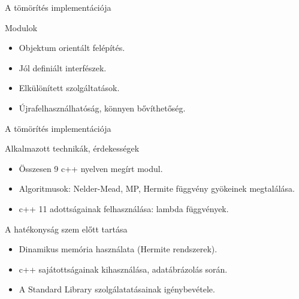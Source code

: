\documentclass{beamer}
\begin{document}
\begin{frame}{A tömörítés implementációja}
\linespread{0.8}
\small
\vspace{-2mm}
\begin{block}{Modulok}
	\begin{itemize}
		\item Objektum orientált felépítés.
		\item Jól definiált interfészek.
		\item Elkülönített szolgáltatások.
		\item Újrafelhasználhatóság, könnyen bővíthetőség.
	\end{itemize}
	\end{block}		
	
\end{frame}

\begin{frame}{A tömörítés implementációja}
\linespread{0.8}
\small
\vspace{-2mm}
\begin{block}{Alkalmazott technikák, érdekességek}
	\begin{itemize}
		\item Összesen 9 c++ nyelven megírt modul.
		\item Algoritmusok: Nelder-Mead, MP, Hermite függvény gyökeinek megtalálása.
		\item c++ 11 adottságainak felhasználása: lambda függvények. 
	\end{itemize}
	\end{block}		
	
\begin{block}{A hatékonyság szem előtt tartása}
	\begin{itemize}
		\item Dinamikus memória használata (Hermite rendszerek).
		\item c++ sajátottságainak kihasználása, adatábrázolás során.
		\item A Standard Library szolgálatatásainak igénybevétele. 
	\end{itemize}
\end{block}		
\end{frame}
\end{document}

